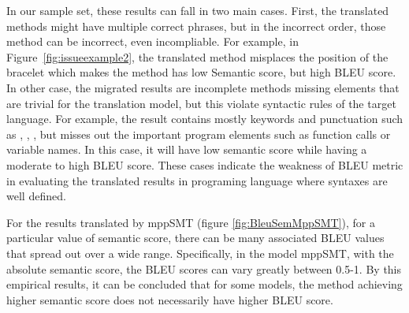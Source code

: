 In our sample set, these results can fall in two main cases. 
First, the translated methods might have multiple correct phrases, but in the 
incorrect order, those method can be incorrect, even incompliable.
%
For example, in Figure~\ref{fig:issueexample2}, the translated method
misplaces the position of the bracelet which makes the method has low
Semantic score, but high BLEU score. 
%
In other case, the migrated results are incomplete methods missing elements
that are trivial for the translation model, but this violate syntactic rules 
of the target language. For example, the result contains mostly keywords and
punctuation such as , , \code{()}, but misses
out the important program elements such as function calls or variable
names. In this case, it will have low semantic score while having
a moderate to high BLEU score. These cases indicate the weakness of BLEU metric 
in evaluating the translated results in programing language where syntaxes are well defined.

For the results translated by mppSMT (figure \ref{fig:BleuSemMppSMT}), 
for a particular value of  semantic score, there can be many associated 
BLEU values that spread out over a wide range. Specifically, in the model 
mppSMT, with the absolute semantic score, the BLEU scores can vary greatly 
between 0.5-1. By this empirical results, it can be concluded that for 
some models, the method achieving higher semantic score does not necessarily 
have higher BLEU score. 

